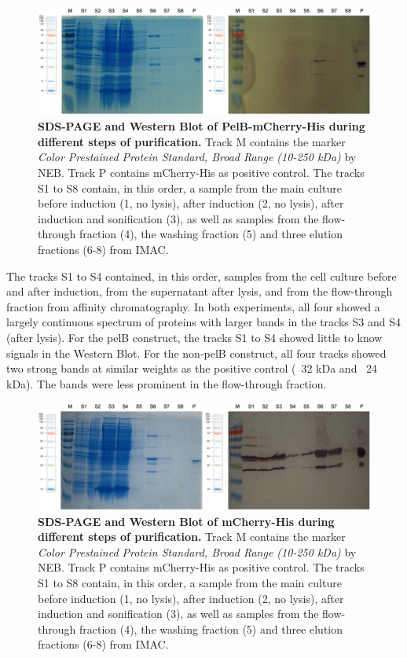 \documentclass[a4paper,12pt]{article}
\begin{document}
\begin{figure}[!htbp]
    \centering
    \includegraphics[width=\textwidth]{images/sds_western_blot.png}
    \caption{\textbf{SDS-PAGE and Western Blot of PelB-mCherry-His during different steps of purification.} Track M contains the marker \emph{Color Prestained Protein Standard, Broad Range (10-250 kDa)} by NEB. Track P contains mCherry-His as positive control. The tracks S1 to S8 contain, in this order, a sample from the main culture before induction (1, no lysis), after induction (2, no lysis), after induction and sonification (3), as well as samples from the flow-through fraction (4), the washing fraction  (5) and three elution fractions (6-8) from IMAC. }
    \label{fig:sds_pelB}
\end{figure}

The tracks S1 to S4 contained, in this order, samples from the cell culture before and after induction, from the supernatant after lysis, and from the flow-through fraction from affinity chromatography. In both experiments, all four showed a largely continuous spectrum of proteins with larger bands in the tracks S3 and S4 (after lysis). For the pelB construct, the tracks S1 to S4 showed little to know signals in the Western Blot. For the non-pelB construct, all four tracks showed two strong bands at similar weights as the positive control (~32 kDa and ~24 kDa). The bands were less prominent in the flow-through fraction.

\begin{figure}[!htbp]
    \centering
    \includegraphics[width=\textwidth]{images/group6_sds_western.png}
    \caption{\textbf{SDS-PAGE and Western Blot of mCherry-His during different steps of purification.} Track M contains the marker \emph{Color Prestained Protein Standard, Broad Range (10-250 kDa)} by NEB. Track P contains mCherry-His as positive control. The tracks S1 to S8 contain, in this order, a sample from the main culture before induction (1, no lysis), after induction (2, no lysis), after induction and sonification (3), as well as samples from the flow-through fraction (4), the washing fraction  (5) and three elution fractions (6-8) from IMAC. }
    \label{fig:sds_non_pelB}
\end{figure}
\end{document}
